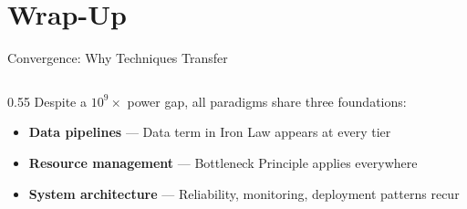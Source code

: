 \documentclass[aspectratio=169, 12pt]{beamer}
\begin{document}
\section{Wrap-Up}

\begin{frame}{Convergence: Why Techniques Transfer}
\note{
%
%
%
%
%
}

\small
\begin{columns}[T]
  \begin{column}{0.55\textwidth}
    Despite a $10^{9}\!\times$ power gap, all paradigms share three foundations:

    \vspace{0.2cm}
    \begin{itemize}\setlength\itemsep{3pt}
      \item \textcolor{datastroke}{\textbf{Data pipelines}} --- Data term in Iron Law appears at every tier
      \item \textcolor{computestroke}{\textbf{Resource management}} --- Bottleneck Principle applies everywhere
      \item \textcolor{routingstroke}{\textbf{System architecture}} --- Reliability, monitoring, deployment patterns recur
    \end{itemize}


\end{column}
\end{columns}
\end{frame}
\end{document}
